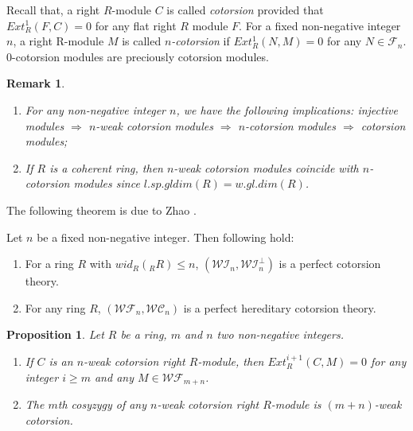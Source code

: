 ﻿\documentclass[
11pt,%
tightenlines,%
twoside,%
onecolumn,%
nofloats,%
nobibnotes,%
nofootinbib,%
superscriptaddress,%
noshowpacs,%
centertags]%
{revtex4}
\newtheorem{proposition}{Proposition}
\newtheorem{remark}{Remark}
\begin{document}
Recall that, a right $R$-module $C$ is called \textit{cotorsion}
\cite{Eno1}  provided that $Ext_R^1(F, C) = 0$ for any flat right
$R$ module $F$. For a fixed non-negative integer $n$, a right
R-module $M$ is called \textit{$n$-cotorsion} \cite{MD} if
$Ext_R^1(N, M) = 0$ for any $N \in \mathcal{F}_n$. $0$-cotorsion
modules are preciously cotorsion modules.
\begin{remark}\label{rk}\
\begin{enumerate}
\item For any non-negative integer $n$, we have the following implications:
injective modules $\Rightarrow$ $n$-weak cotorsion modules
$\Rightarrow$   $n$-cotorsion modules $\Rightarrow$ cotorsion
modules;
\item If $R$ is a coherent ring, then $n$-weak cotorsion modules coincide with
$n$-cotorsion modules since $l.sp.gldim(R) = w. gl.dim(R)$.
\end{enumerate}
\end{remark}

 The following theorem is due to Zhao \cite[Proposition $4.17$ and Proposition $4.18$]{Zo}.

\begin{theorem}\label{tm1}
Let $n$ be a fixed non-negative integer. Then following hold:
\begin{enumerate}
\item For a ring $R$ with $wid_R(_RR) \leq n$, $(\mathcal{WI}_n, \mathcal{WI}_n^\bot)$
is a perfect cotorsion theory.
\item For any ring $R$, $(\mathcal{WF}_n, \mathcal{WC}_n)$ is a perfect hereditary cotorsion theory.
\end{enumerate}
\end{theorem}

\begin{proposition}
Let $R$ be a ring, $m$ and $n$ two non-negative integers.
\begin{enumerate}
\item If $C$ is an $n$-weak cotorsion right $R$-module, then $Ext_R^{i+1}(C, M) = 0$
for any integer $i \geq m$ and any $M \in \mathcal{WF}_{m + n}$.
\item The $m$th cosyzygy of any $n$-weak cotorsion right $R$-module is $(m + n)$-weak cotorsion.
\end{enumerate}
\end{proposition}
\end{document}
